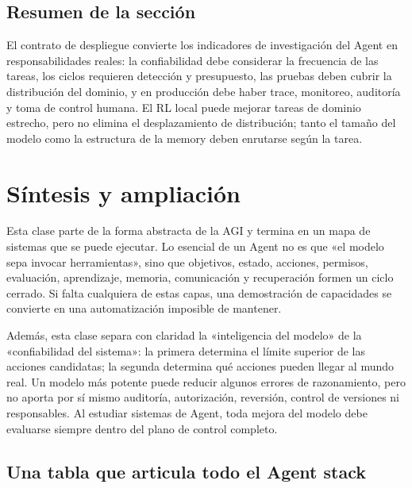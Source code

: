 \documentclass[a4paper]{article}
\begin{document}
\subsection{Resumen de la sección}

El contrato de despliegue convierte los indicadores de investigación del Agent en responsabilidades reales: la confiabilidad debe considerar la frecuencia de las tareas, los ciclos requieren detección y presupuesto, las pruebas deben cubrir la distribución del dominio, y en producción debe haber trace, monitoreo, auditoría y toma de control humana. El RL local puede mejorar tareas de dominio estrecho, pero no elimina el desplazamiento de distribución; tanto el tamaño del modelo como la estructura de la memory deben enrutarse según la tarea.
\section{Síntesis y ampliación}

Esta clase parte de la forma abstracta de la AGI y termina en un mapa de sistemas que se puede ejecutar. Lo esencial de un Agent no es que «el modelo sepa invocar herramientas», sino que objetivos, estado, acciones, permisos, evaluación, aprendizaje, memoria, comunicación y recuperación formen un ciclo cerrado. Si falta cualquiera de estas capas, una demostración de capacidades se convierte en una automatización imposible de mantener.

Además, esta clase separa con claridad la «inteligencia del modelo» de la «confiabilidad del sistema»: la primera determina el límite superior de las acciones candidatas; la segunda determina qué acciones pueden llegar al mundo real. Un modelo más potente puede reducir algunos errores de razonamiento, pero no aporta por sí mismo auditoría, autorización, reversión, control de versiones ni responsables. Al estudiar sistemas de Agent, toda mejora del modelo debe evaluarse siempre dentro del plano de control completo.

\subsection{Una tabla que articula todo el Agent stack}
\end{document}

